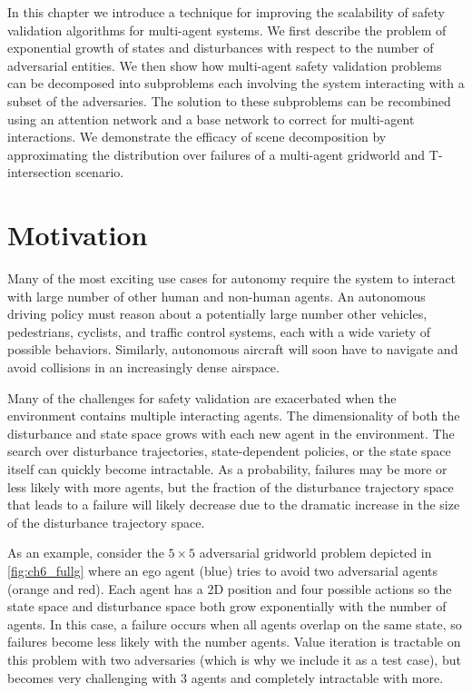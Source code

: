 In this chapter we introduce a technique for improving the scalability of safety validation algorithms for multi-agent systems. We first describe the problem of exponential growth of states and disturbances with respect to the number of adversarial entities. We then show how multi-agent safety validation problems can be decomposed into subproblems each involving the system interacting with a subset of the adversaries. The solution to these subproblems can be recombined using an attention network and a base network to correct for multi-agent interactions. We demonstrate the efficacy of scene decomposition by approximating the distribution over failures of a multi-agent gridworld and T-intersection scenario. 

\section{Motivation}

Many of the most exciting use cases for autonomy require the system to interact with large number of other human and non-human agents. An autonomous driving policy must reason about a potentially large number other vehicles, pedestrians, cyclists, and traffic control systems, each with a wide variety of possible behaviors. Similarly, autonomous aircraft will soon have to navigate and avoid collisions in an increasingly dense airspace.

Many of the challenges for safety validation are exacerbated when the environment contains multiple interacting agents. The dimensionality of both the disturbance and state space grows with each new agent in the environment. The search over disturbance trajectories, state-dependent policies, or the state space itself can quickly become intractable. As a probability, failures may be more or less likely with more agents, but the fraction of the disturbance trajectory space that leads to a failure will likely decrease due to the dramatic increase in the size of the disturbance trajectory space. 

As an example, consider the $5 \times 5$ adversarial gridworld problem depicted in \cref{fig:ch6_fullg} where an ego agent (blue) tries to avoid two adversarial agents (orange and red).  Each agent has a 2D position and four possible actions so the state space and disturbance space both grow exponentially with the number of agents. In this case, a failure occurs when all agents overlap on the same state, so failures become less likely with the number agents. Value iteration is tractable on this problem with two adversaries (which is why we include it as a test case), but becomes very challenging with \num{3} agents and completely intractable with more.

